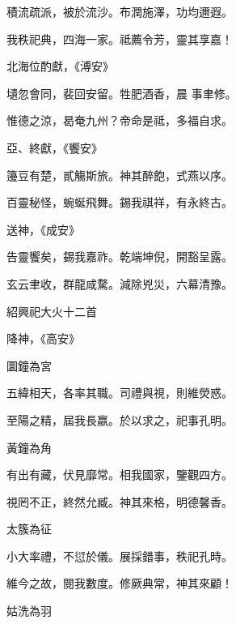 \begin{pinyinscope}
 積流疏派，被於流沙。布潤施澤，功均邇遐。



 我秩祀典，四海一家。祗薦令芳，靈其享嘉！



 北海位酌獻，《溥安》



 壝忽會同，裴回安留。牲肥酒香，晨
 事聿修。



 惟德之涼，曷奄九州？帝命是祗，多福自求。



 亞、終獻，《饗安》



 籩豆有楚，貳觴斯旅。神其醉飽，式燕以序。



 百靈秘怪，蜿蜒飛舞。錫我祺祥，有永終古。



 送神，《成安》



 告靈饗矣，錫我嘉祚。乾端坤倪，開豁呈露。



 玄云聿收，群龍咸騖。減除兇災，六幕清豫。



 紹興祀大火十二首



 降神，《高安》



 圜鐘為宮



 五緯相天，各率其職。司禮與視，則維熒惑。



 至陽之精，屆我長嬴。於以求之，祀事孔明。



 黃鐘為角



 有出有藏，伏見靡常。相我國家，鑒觀四方。



 視罔不正，終然允臧。神其來格，明德馨香。



 太簇為征



 小大率禮，不愆於儀。展採錯事，秩祀孔時。



 維今之故，閱我數度。修厥典常，神其來顧！



 姑洗為羽




\end{pinyinscope}
